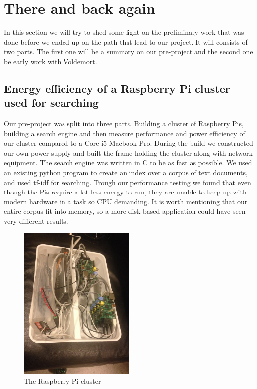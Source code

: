 \section{There and back again}
\label{sec:prequel}
In this section we will try to shed some light on the preliminary work that was done before we ended up on the path that lead to our project. It will consists of two parts. The first one will be a summary on our pre-project and the second one be early work with Voldemort.

\subsection{Energy efficiency of a Raspberry Pi cluster used for searching}
Our pre-project was split into three parts. Building a cluster of Raspberry Pis, building a search engine and then measure performance and power efficiency of our cluster compared to a Core i5 Macbook Pro. During the build we constructed our own power supply and built the frame holding the cluster along with network equipment. The search engine was written in C to be as fast as possible. We used an existing python program to create an index over a corpus of text documents, and used tf-idf for searching. Trough our performance testing we found that even though the Pis require a lot less energy to run, they are unable to keep up with modern hardware in a task so CPU demanding. It is worth mentioning that our entire corpus fit into memory, so a more disk based application could have seen very different results.

\begin{figure}[h]
    \centering
    \includegraphics[width=0.5\textwidth]{thereandbackagain/cluster_beautiful.jpg}
    \caption{The Raspberry Pi cluster}
    \label{fig:cluster}
\end{figure}

